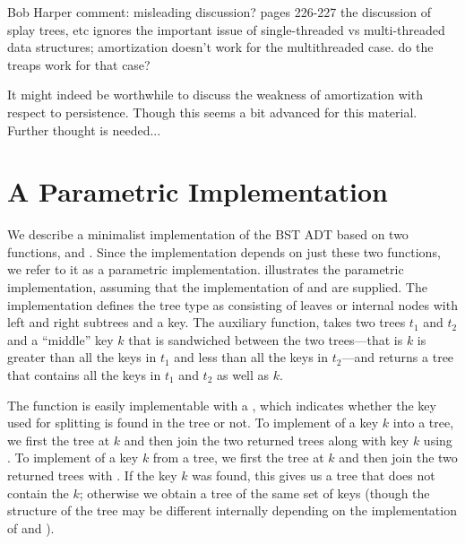
\begin{todo}

Bob Harper comment:
misleading discussion? pages 226-227 the discussion of splay trees,
etc ignores the important issue of single-threaded vs multi-threaded
data structures; amortization doesn't work for the multithreaded case.
do the treaps work for that case?

It might indeed be worthwhile to discuss the weakness of amortization
with respect to persistence.  Though this seems a bit advanced for
this material.  Further thought is needed...

\end{todo}


\section{A Parametric Implementation}
\label{sec:bst::parametric}

We describe a minimalist implementation of the BST ADT based on two
functions,  and . 
%
Since the implementation depends on just these two functions, we refer
to it as a parametric implementation.
%
 illustrates the parametric implementation,
assuming that the implementation of  and  are
supplied. 
%
The implementation defines the tree type as consisting of
leaves or internal nodes with left and right subtrees and a key.
%
The auxiliary function,  takes two trees $t_1$ and $t_2$
and a ``middle'' key $k$ that is sandwiched between the two
trees---that is $k$ is greater than all the keys in $t_1$ and less
than all the keys in $t_2$---and returns a tree that contains all the
keys in $t_1$ and $t_2$ as well as $k$.




The function  is easily implementable with a
, which indicates whether the key used for splitting is
found in the tree or not.
%
To implement  of a key $k$ into a tree, we first
 the tree at $k$ and then join the two returned
trees along with key $k$ using .
%
To implement  of a key $k$ from a tree, we first
 the tree at $k$ and then join the two returned
trees with . 
%
If the key $k$ was found, this gives us a tree that does not contain
the $k$; otherwise we obtain a tree of the same set of keys (though
the structure of the tree may be different internally depending on the
implementation of  and ).

